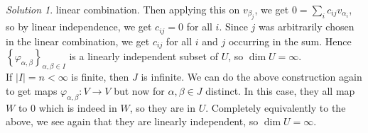 \documentclass[reqno]{amsart}
\theoremstyle{definition}
\theoremstyle{remark}
\newtheorem*{solution}{Solution}
\begin{document}
\begin{solution}
        linear combination. Then
        applying this on $v_{\beta_j}$, we get
        $0 = \sum_{i} c_{ij} v_{\alpha_i} $, so by
        linear independence, we get $c_{ij} = 0$ for all $i$.
        Since $j$ was arbitrarily chosen in the linear combination,
        we get $c_{ij}$ for all $i$ and $j$ occurring in the sum.
        Hence $\left\{ \varphi_{\alpha, \beta} \right\}_{\alpha,
        \beta \in I}$ is a linearly independent subset of
        $U$, so $\dim U = \infty$.\\
        \linebreak
        If $\left| I \right| = n < \infty$ is finite,
        then $J$ is infinite. We can do the above construction
        again to get maps $\varphi_{\alpha,\beta} \colon
        V \to V$ but now for $\alpha,\beta \in J$ distinct.
        In this case, they all map $W$ to $0$ which is indeed
        in $W$, so they are in $U$. Completely equivalently to the
        above, we see again that they are linearly independent, so
        $\dim U = \infty$.
    \end{solution}
    

\end{document}
